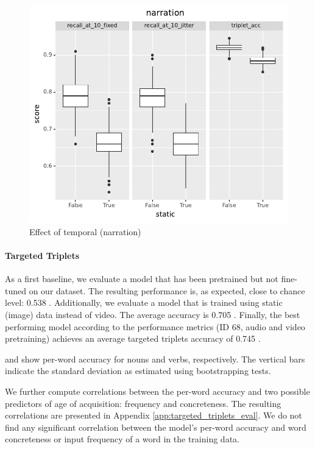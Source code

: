  \begin{figure}
  \centering
  \includegraphics[width=\textwidth]{results/slides/static_narration.pdf}
  \caption{Effect of temporal (narration)}
  \label{fig:static-narration}
\end{figure}

\paragraph{Targeted Triplets}
As a first baseline, we evaluate a model that has been pretrained but not fine-tuned on our dataset. The resulting performance is, as expected, close to chance level: 0.538 . Additionally, we evaluate a model that is trained using static (image) data instead of video. The average accuracy is 0.705 . Finally, the best performing model according to the
performance metrics (ID 68, audio and video pretraining) achieves an average
targeted triplets accuracy of 0.745 .

 and
 show per-word
accuracy for nouns and verbs, respectively. The vertical
bars indicate the standard deviation as estimated using bootstrapping
tests.

We further compute correlations between the per-word accuracy and two possible predictors of age of acquisition: frequency and concreteness. The resulting correlations are presented in Appendix \ref{app:targeted_triplets_eval}. We do not find any significant correlation between the model's per-word accuracy and word concreteness or input frequency of a word in the training data.




